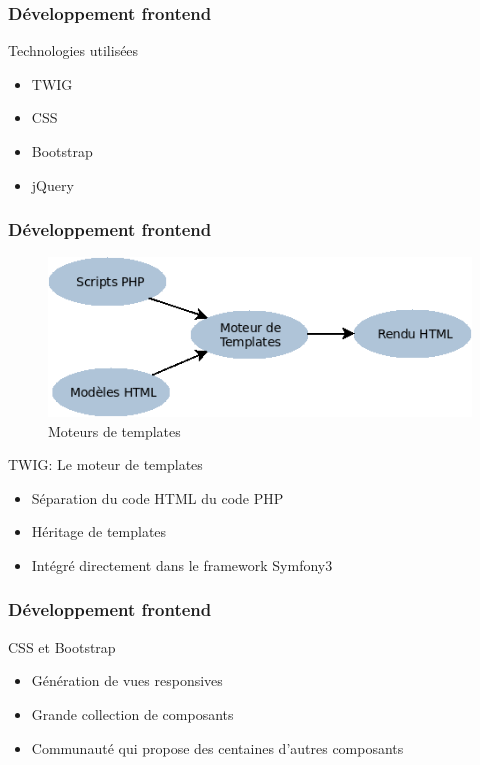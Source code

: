 \speaker{\Juliana}

\begin{frame}
\frametitle{Développement frontend}
\begin{block}{Technologies utilisées}
	\begin{itemize}
		\item TWIG
		\item CSS
		\item Bootstrap
		\item jQuery
	\end{itemize}
\end{block}
\end{frame}

\begin{frame}
\frametitle{Développement frontend}



      \begin{figure}[r]
		\includegraphics[scale=0.3]{images/moteursTemp.png}
		\caption{Moteurs de templates}
	  \end{figure}
\begin{block}{TWIG: Le moteur de templates }
	
		\begin{itemize}
			\item Séparation du code HTML du code PHP
			\item Héritage de templates
			\item Intégré directement dans le framework Symfony3
		\end{itemize}
\end{block}
\end{frame}

\begin{frame}
\frametitle{Développement frontend}
\begin{block}{ CSS et Bootstrap }
	\begin{itemize}
		\item Génération de vues responsives
		\item Grande collection de composants
		\item Communauté qui propose des centaines d'autres composants
	\end{itemize}
\end{block}
\end{frame}

